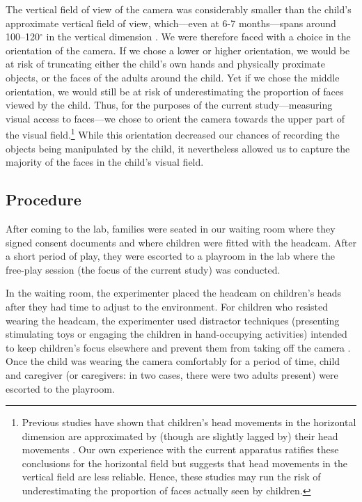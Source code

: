\documentclass[man,noapacite]{apa2}
\begin{document}
The vertical field of view of the camera was considerably smaller than the child's approximate vertical field of view, which---even at 6-7 months---spans around 100--120$^{\circ}$ in the vertical dimension \cite{mayer1988,cummings1988}. We were therefore faced with a choice in the orientation of the camera. If we chose a lower or higher orientation, we would be at risk of truncating either the child's own hands and physically proximate objects, or the faces of the adults around the child. Yet if we chose the middle orientation, we would still be at risk of underestimating the proportion of faces viewed by the child. Thus, for the purposes of the current study---measuring visual access to faces---we chose to orient the camera towards the upper part of the visual field.\footnote{Previous studies have shown that children's head movements in the horizontal dimension are approximated by (though are slightly lagged by) their head movements \cite{yoshida2008}. Our own experience with the current apparatus ratifies these conclusions for the horizontal field but suggests that head movements in the vertical field are less reliable. Hence, these studies may run the risk of underestimating the proportion of faces actually seen by children.} While this orientation decreased our chances of recording the objects being manipulated by the child, it nevertheless allowed us to capture the majority of the faces in the child's visual field.

\subsection{Procedure}

After coming to the lab, families were seated in our waiting room where they signed consent documents and where children were fitted with the headcam. After a short period of play, they were escorted to a playroom in the lab where the free-play session (the focus of the current study) was conducted. 

In the waiting room, the experimenter placed the headcam on children's heads after they had time to adjust to the environment. For children who resisted wearing the headcam, the experimenter used distractor techniques (presenting stimulating toys or engaging the children in hand-occupying activities) intended to keep children's focus elsewhere and prevent them from taking off the camera \cite{yoshida2008}. Once the child was wearing the camera comfortably for a period of time, child and caregiver (or caregivers: in two cases, there were two adults present) were escorted to the playroom. 
\end{document}
